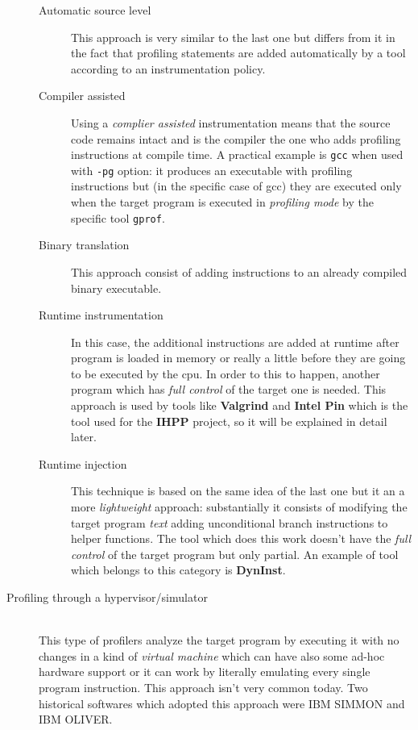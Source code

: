 \documentclass[a4paper,11pt]{report}
\begin{document}
\begin{description}
\begin{description}
\item[Automatic source level]
This approach is very similar to the last one but differs from it in the fact that profiling statements are added automatically by a tool according to an instrumentation policy.

\item[Compiler assisted]
Using a \emph{complier assisted} instrumentation means that the source code remains intact and is the compiler the one who adds profiling instructions at compile time. A practical example is \verb|gcc| when used with \verb|-pg| option: it produces an executable with profiling instructions but (in the specific case of gcc) they are executed only when the target program is executed in \emph{profiling mode} by the specific tool \verb|gprof|.

\item[Binary translation]
This approach consist of adding instructions to an already compiled binary executable.

\item[Runtime instrumentation]
In this case, the additional instructions are added at runtime after program is loaded in memory or really a little before 
they are going to be executed by the cpu. In order to this to happen, another program which has \emph{full control} of the target one is needed. This approach is used by tools like \textbf{Valgrind} and \textbf{Intel Pin} which is the tool used for the \textbf{IHPP} project, so it will be explained in detail later.

\item[Runtime injection]
This technique is based on the same idea of the last one but it an a more \emph{lightweight} approach: substantially it consists of modifying the target program \emph{text} adding unconditional branch instructions to helper functions. The tool which does this work doesn't have the \emph{full control} of the target program but only partial. An example of tool which belongs to this category is \textbf{DynInst}.

\end{description} 

\item[Profiling through a hypervisor/simulator] \hfill \\
This type of profilers analyze the target program by executing it with no changes in a kind of \emph{virtual machine} which can have also some ad-hoc hardware support or it can work by literally emulating every single program instruction. This approach isn't very common today. Two historical softwares which adopted this approach were IBM SIMMON and IBM OLIVER.

\end{description}
\end{document}
